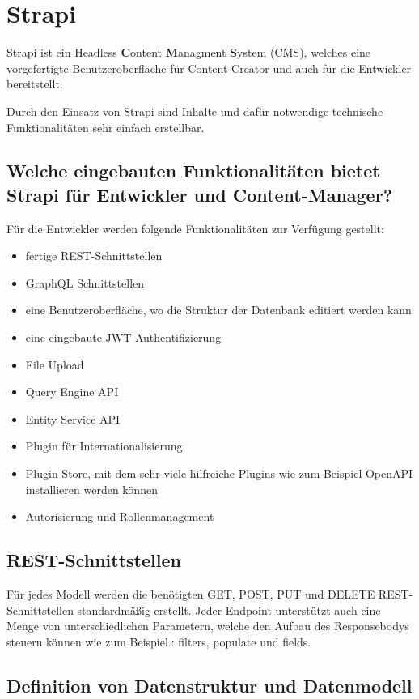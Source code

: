 \section{Strapi}
Strapi ist ein Headless \textbf{C}ontent \textbf{M}anagment \textbf{S}ystem (CMS),
welches eine vorgefertigte Benutzeroberfläche für Content-Creator
und auch für die Entwickler bereitstellt.

Durch den Einsatz von Strapi sind Inhalte und dafür notwendige technische Funktionalitäten
sehr einfach erstellbar.
\cite{strapi-vs-wordpress}


\subsection*{Welche eingebauten Funktionalitäten bietet Strapi für Entwickler und Content-Manager?}


Für die Entwickler werden folgende Funktionalitäten zur Verfügung gestellt:

\begin{itemize}
  \item fertige REST-Schnittstellen
  \item GraphQL Schnittstellen
  \item eine Benutzeroberfläche, wo die Struktur der Datenbank editiert werden kann
  \item eine eingebaute JWT Authentifizierung
  \item File Upload
  \item Query Engine API
  \item Entity Service API
  \item Plugin für Internationalisierung
  \item Plugin Store, mit dem sehr viele hilfreiche Plugins wie zum Beispiel OpenAPI installieren werden können
  \item Autorisierung und Rollenmanagement
\end{itemize}

\subsection{REST-Schnittstellen}
\label{subsec:rest}
Für jedes Modell werden die benötigten GET, POST, PUT und DELETE REST-Schnittstellen standardmäßig erstellt.
Jeder Endpoint unterstützt auch eine Menge von unterschiedlichen Parametern, welche den Aufbau des Responsebodys steuern können wie zum Beispiel.: filters, populate  und fields.
\cite{rest-query-parameters}
\subsection{Definition von Datenstruktur und Datenmodell}

